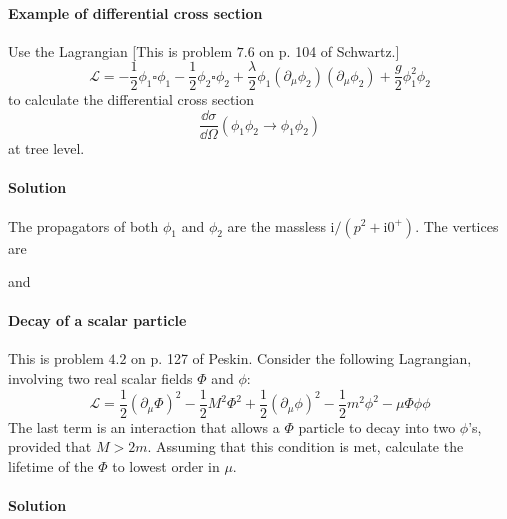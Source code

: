\documentclass[hyperref, a4paper]{article}
\newcommand*{\ii}{\mathrm{i}}
\begin{document}
\paragraph{}

\paragraph{Example of differential cross section} Use the Lagrangian [This is problem $7.6$ on p. 104 of Schwartz.]
\[
\mathcal{L}=-\frac{1}{2} \phi_{1} \square \phi_{1}-\frac{1}{2} \phi_{2} \square \phi_{2}+\frac{\lambda}{2} \phi_{1}\left(\partial_{\mu} \phi_{2}\right)\left(\partial_{\mu} \phi_{2}\right)+\frac{g}{2} \phi_{1}^{2} \phi_{2}
\]
to calculate the differential cross section
\[
\frac{\dd \sigma}{\dd \Omega}\left(\phi_{1} \phi_{2} \rightarrow \phi_{1} \phi_{2}\right)
\]
at tree level.

\paragraph{Solution} The propagators of both $\phi_1$ and $\phi_2$ are the massless $\ii / (p^2 + \ii 0^+)$.
The vertices are 

and


\paragraph{}

\paragraph{Decay of a scalar particle} This is problem $4.2$ on p. 127 of Peskin. Consider the following Lagrangian, involving two real scalar fields $\Phi$ and $\phi$:
\[
\mathcal{L}=\frac{1}{2}\left(\partial_{\mu} \Phi\right)^{2}-\frac{1}{2} M^{2} \Phi^{2}+\frac{1}{2}\left(\partial_{\mu} \phi\right)^{2}-\frac{1}{2} m^{2} \phi^{2}-\mu \Phi \phi \phi
\]
The last term is an interaction that allows a $\Phi$ particle to decay into two $\phi$'s, provided that $M>2 m$. Assuming that this condition is met, calculate the lifetime of the $\Phi$ to lowest order in $\mu$.

\paragraph{Solution}

\paragraph{}


 
\end{document}
